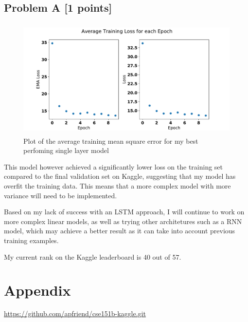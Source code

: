 \documentclass{article}
\begin{document}
    \subsection{Problem A [1 points]}
        
        \begin{figure}[H]
            \centering
            \includegraphics[height=6cm]{figures/train-loss/2021.05.24-multi-linear-ema075-epoch10-batchsz128-epoch-avg.pdf}%
            \caption{Plot of the average training mean square error for my best perfoming single layer model}%
            \label{fig:5}
        \end{figure}

        This model however achieved a significantly lower loss on the training set compared to the final validation set on Kaggle,
        suggesting that my model has overfit the training data. This means that a more complex model with more variance will need to be implemented.

        Based on my lack of success with an LSTM approach, I will continue to work on more complex linear models, as well as trying other architetures
        such as a RNN model, which may achieve a better result as it can take into account previous training examples.

        My current rank on the Kaggle leaderboard is 40 out of 57.

    \appendix

        \section{Appendix}
        
        \url{https://github.com/apfriend/cse151b-kaggle.git}
\end{document}

